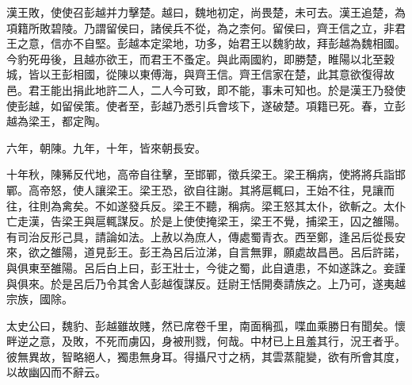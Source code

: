 漢王敗，使使召彭越并力擊楚。越曰，魏地初定，尚畏楚，未可去。漢王追楚，為項籍所敗碧陵。乃謂留侯曰，諸侯兵不從，為之柰何。留侯曰，齊王信之立，非君王之意，信亦不自堅。彭越本定梁地，功多，始君王以魏豹故，拜彭越為魏相國。今豹死毋後，且越亦欲王，而君王不蚤定。與此兩國約，即勝楚，睢陽以北至穀城，皆以王彭相國，從陳以東傅海，與齊王信。齊王信家在楚，此其意欲復得故邑。君王能出捐此地許二人，二人今可致，即不能，事未可知也。於是漢王乃發使使彭越，如留侯策。使者至，彭越乃悉引兵會垓下，遂破楚。項籍已死。春，立彭越為梁王，都定陶。

六年，朝陳。九年，十年，皆來朝長安。

十年秋，陳豨反代地，高帝自往擊，至邯鄲，徵兵梁王。梁王稱病，使將將兵詣邯鄲。高帝怒，使人讓梁王。梁王恐，欲自往謝。其將扈輒曰，王始不往，見讓而往，往則為禽矣。不如遂發兵反。梁王不聽，稱病。梁王怒其太仆，欲斬之。太仆亡走漢，告梁王與扈輒謀反。於是上使使掩梁王，梁王不覺，捕梁王，囚之雒陽。有司治反形己具，請論如法。上赦以為庶人，傳處蜀青衣。西至鄭，逢呂后從長安來，欲之雒陽，道見彭王。彭王為呂后泣涕，自言無罪，願處故昌邑。呂后許諾，與俱東至雒陽。呂后白上曰，彭王壯士，今徙之蜀，此自遺患，不如遂誅之。妾謹與俱來。於是呂后乃令其舍人彭越復謀反。廷尉王恬開奏請族之。上乃可，遂夷越宗族，國除。

太史公曰，魏豹、彭越雖故賤，然已席卷千里，南面稱孤，喋血乘勝日有聞矣。懷畔逆之意，及敗，不死而虜囚，身被刑戮，何哉。中材已上且羞其行，況王者乎。彼無異故，智略絕人，獨患無身耳。得攝尺寸之柄，其雲蒸龍變，欲有所會其度，以故幽囚而不辭云。